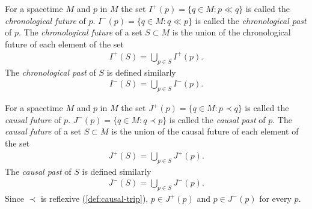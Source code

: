 \medskip

\begin{definition}
    \label{def:chronological-future-and-chronological-past}
    \leanok
    For a spacetime $M$ and $p$ in $M$ the set $I^+(p) = \{q \in M : p \ll q\}$ is called the \textit{chronological future} of $p$. $I^-(p) = \{q \in M : q \ll p\}$ is called the \textit{chronological past} of $p$. The \textit{chronological future} of a set $S \subset M$ is the union of the chronological future of each element of the set
    \begin{align}
        I^+(S) = \bigcup\limits_{p \in S} I^+(p).
    \end{align}
    The \textit{chronological past} of $S$ is defined similarly
    \begin{align}
        I^-(S) = \bigcup\limits_{p \in S} I^-(p).
    \end{align}
\end{definition}

\medskip

\begin{definition}
    \label{def:causal-future-and-causal-past}
    \leanok
    For a spacetime $M$ and $p$ in $M$ the set $J^+(p) = \{q \in M : p \prec q\}$ is called the \textit{causal future} of $p$. $J^-(p) = \{q \in M : q \prec p\}$ is called the \textit{causal past} of $p$. The \textit{causal future} of a set $S \subset M$ is the union of the causal future of each element of the set
    \begin{align}
        J^+(S) = \bigcup\limits_{p \in S} J^+(p).
    \end{align}
    The \textit{causal past} of $S$ is defined similarly
    \begin{align}
        J^-(S) = \bigcup\limits_{p \in S} J^-(p).
    \end{align}
    Since $\prec$ is reflexive (\ref{def:causal-trip}), $p \in J^+(p)$ and $p \in J^-(p)$ for every $p$.
\end{definition}

